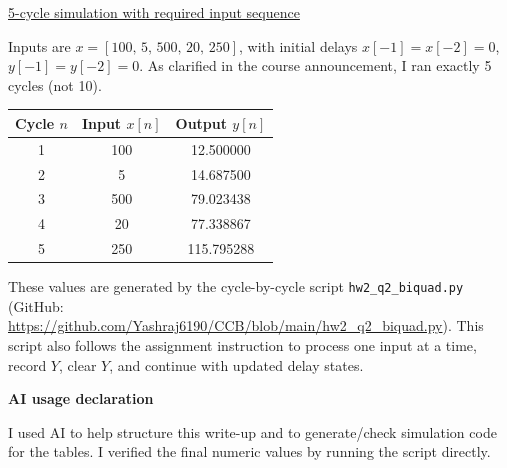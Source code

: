 \documentclass[12pt]{article}
\begin{document}
\medskip
\noindent\underline{5-cycle simulation with required input sequence}

Inputs are $x = [100,\,5,\,500,\,20,\,250]$, with initial delays $x[-1]=x[-2]=0$, $y[-1]=y[-2]=0$.
As clarified in the course announcement, I ran exactly 5 cycles (not 10).

\begin{center}
\begin{tabular}{c c c}
\hline
Cycle $n$ & Input $x[n]$ & Output $y[n]$ \\
\hline
1 & 100 & 12.500000 \\
2 & 5   & 14.687500 \\
3 & 500 & 79.023438 \\
4 & 20  & 77.338867 \\
5 & 250 & 115.795288 \\
\hline
\end{tabular}
\end{center}

These values are generated by the cycle-by-cycle script \texttt{hw2\_q2\_biquad.py} (GitHub: \url{https://github.com/Yashraj6190/CCB/blob/main/hw2_q2_biquad.py}). This script also follows the assignment instruction to process one input at a time, record $Y$, clear $Y$, and continue with updated delay states.

\bigskip
\noindent\textbf{AI usage declaration}

I used AI to help structure this write-up and to generate/check simulation code for the tables. I verified the final numeric values by running the script directly.
\end{document}
